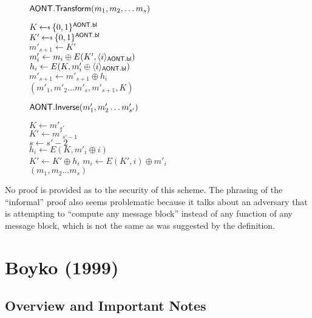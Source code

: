 \documentclass[11pt,twoside]{article}
\begin{document}
\begin{figure}[h]
{
\underline{$\mathsf{AONT.Transform}(m_1,m_2,\dots m_s)$}

\begin{algorithm}[H]
$K\getsr \bits^\schemefont{AONT.bl}$\\
$K'\getsr \bits^\schemefont{AONT.bl}$\\
$m'_{s+1}\gets K'$\\
{
$m'_i\gets m_i \oplus E(K',\langle i \rangle_{\mathsf{AONT.bl}})$\\
$h_i\gets E(K,m'_i\oplus \langle i \rangle_{\mathsf{AONT.bl}})$\\
$m'_{s+1}\gets m'_{s+1}\oplus h_i$\\
}
\Return $(m'_1,m'_2\dots m'_s, m'_{s+1}, K)$
\end{algorithm}
}
{
\underline{$\mathsf{AONT.Inverse}(m'_1,m'_2\dots m'_{s'})$}

\begin{algorithm}[H]
$K\gets m'_{s'}$\\
$K'\gets m'_{s'-1}$\\
$s\gets s'-2$\\
{
$h_i\gets E(K,m'_i\oplus i)$\\
$K'\gets K'\oplus h_i$
}
{
$m_i\gets E(K',i)\oplus m'_i$\\
}
\Return $(m_1,m_2\dots m_{s})$
\end{algorithm}
}
\end{figure} 

No proof is provided as to the security of this scheme. The phrasing of the ``informal'' proof also seems problematic because it talks about an adversary that is attempting to ``compute any message block'' instead of any function of any message block, which is not the same as was suggested by the definition.

\pagebreak 

\section{Boyko (1999)}

\subsection{Overview and Important Notes} 
\end{document}
